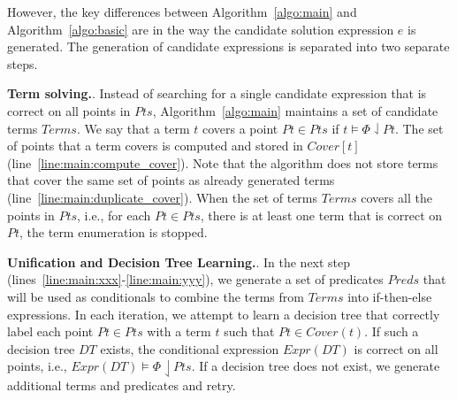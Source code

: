 \documentclass{llncs}
\newcommand\Points{\mathit{Pts}}
\newcommand\Point{\mathit{Pt}}
\newcommand\Predicates{\mathit{Preds}}
\newcommand\Expr{e}
\newcommand\Terms{\mathit{Terms}}
\newcommand\Term{t}
\newcommand\Cover{\mathit{Cover}}
\newcommand\Spec{\Phi}
\newcommand\DecisionTree{\mathit{DT}}
\newcommand\DTtoExpr[1]{\mathit{Expr}(#1)}
\renewcommand{\paragraph}[1]{\par\noindent\textbf{#1}.}
\begin{document}
However, the key differences between Algorithm~\ref{algo:main} and
Algorithm~\ref{algo:basic} are in the way the candidate solution
expression $\Expr$ is generated.
The generation of candidate expressions is separated into two separate
steps.

\paragraph{Term solving.}
Instead of searching for a single candidate expression that is correct
on all points in $\Points$, Algorithm~\ref{algo:main} maintains a set of
candidate terms $\Terms$.
We say that a term $\Term$ covers a point $\Point \in \Points$ if $\Term
\models \Spec \downharpoonleft \Point$.
The set of points that a term covers is computed and stored in
$\Cover[\Term]$ (line~\ref{line:main:compute_cover}).
Note that the algorithm does not store terms that cover the same set of
points as already generated terms
(line~\ref{line:main:duplicate_cover}).
When the set of terms $\Terms$ covers all the points in $\Points$, i.e., for
each $\Point \in \Points$, there is at least one term that is correct on
$\Point$, the term enumeration is stopped.

\paragraph{Unification and Decision Tree Learning.}
In the next step (lines~\ref{line:main:xxx}-\ref{line:main:yyy}), we
generate a set of predicates $\Predicates$ that will be used as
conditionals to combine the terms from $\Terms$ into if-then-else
expressions.
In each iteration, we attempt to learn a decision tree that correctly
label each point $\Point \in \Points$ with a term $\Term$ such that
$\Point \in \Cover(\Term)$.
If such a decision tree $\DecisionTree$ exists, the conditional
expression $\DTtoExpr{\DecisionTree}$ is correct on all points, i.e.,
$\DTtoExpr{\DecisionTree} \models \Spec \downharpoonleft \Points$.
If a decision tree does not exist, we generate additional terms and
predicates and retry.
\end{document}
